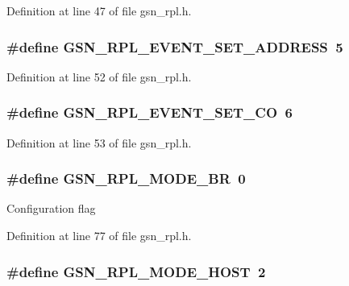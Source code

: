 Definition at line 47 of file gsn\_\-rpl.h.

\hypertarget{a00579_af5574a96e9702824c5a537085b3c8cce}{
\subsubsection[{GSN\_\-RPL\_\-EVENT\_\-SET\_\-ADDRESS}]{\setlength{\rightskip}{0pt plus 5cm}\#define GSN\_\-RPL\_\-EVENT\_\-SET\_\-ADDRESS~5}}
\label{a00579_af5574a96e9702824c5a537085b3c8cce}


Definition at line 52 of file gsn\_\-rpl.h.

\hypertarget{a00579_a0911a69569ce8084040d5a7858cf805c}{
\subsubsection[{GSN\_\-RPL\_\-EVENT\_\-SET\_\-CO}]{\setlength{\rightskip}{0pt plus 5cm}\#define GSN\_\-RPL\_\-EVENT\_\-SET\_\-CO~6}}
\label{a00579_a0911a69569ce8084040d5a7858cf805c}


Definition at line 53 of file gsn\_\-rpl.h.

\hypertarget{a00579_a48f959880ea8283379ed591e3599c6bc}{
\subsubsection[{GSN\_\-RPL\_\-MODE\_\-BR}]{\setlength{\rightskip}{0pt plus 5cm}\#define GSN\_\-RPL\_\-MODE\_\-BR~0}}
\label{a00579_a48f959880ea8283379ed591e3599c6bc}
Configuration flag 

Definition at line 77 of file gsn\_\-rpl.h.

\hypertarget{a00579_abbc9f7466e7b1bb3933f985f83527a2a}{
\subsubsection[{GSN\_\-RPL\_\-MODE\_\-HOST}]{\setlength{\rightskip}{0pt plus 5cm}\#define GSN\_\-RPL\_\-MODE\_\-HOST~2}}
\label{a00579_abbc9f7466e7b1bb3933f985f83527a2a}


